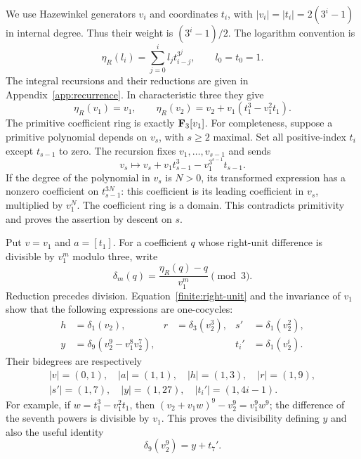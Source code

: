 We use Hazewinkel generators $v_i$ and coordinates $t_i$, with
$|v_i|=|t_i|=2(3^i-1)$ in internal degree.  Thus their weight is
$(3^i-1)/2$.  The logarithm convention is
\[
 \eta_R(l_i)=\sum_{j=0}^i l_jt_{i-j}^{3^j},\qquad l_0=t_0=1.
\]
The integral recursions and their reductions are given in
Appendix~\ref{app:recurrence}.  In characteristic three they give
\begin{equation}\label{finite:right-unit}
 \eta_R(v_1)=v_1,\qquad
 \eta_R(v_2)=v_2+v_1(t_1^3-v_1^2t_1).
\end{equation}
The primitive coefficient ring is exactly $\mathbf F_3[v_1]$.  For
completeness, suppose a primitive polynomial depends on $v_s$, with
$s\geq2$ maximal.  Set all positive-index $t_i$ except $t_{s-1}$ to
zero.  The recursion fixes $v_1,\ldots,v_{s-1}$ and sends
\[
 v_s\longmapsto v_s+v_1t_{s-1}^3-v_1^{3^{s-1}}t_{s-1}.
\]
If the degree of the polynomial in $v_s$ is $N>0$, its transformed
expression has a nonzero coefficient on $t_{s-1}^{3N}$: this
coefficient is its leading coefficient in $v_s$, multiplied by
$v_1^N$.  The coefficient ring is a domain.  This contradicts
primitivity and proves the assertion by descent on $s$.

Put $v=v_1$ and $a=[t_1]$.  For a coefficient $q$ whose right-unit
difference is divisible by $v_1^m$ modulo three, write
\[
 \delta_m(q)=\frac{\eta_R(q)-q}{v_1^m}\pmod3.
\]
Reduction precedes division.  Equation~\eqref{finite:right-unit} and
the invariance of $v_1$ show that the following expressions are
one-cocycles:
\begin{align*}
 h&=\delta_1(v_2),& r&=\delta_3(v_2^3),&
 s'&=\delta_1(v_2^2),\\
y&=\delta_9(v_2^9-v_1^8v_2^7),&&&
 t_i'&=\delta_1(v_2^i).
\end{align*}
Their bidegrees are respectively
\begin{gather*}
 |v|=(0,1),\quad |a|=(1,1),\quad |h|=(1,3),\quad |r|=(1,9),\\
 |s'|=(1,7),\quad |y|=(1,27),\quad |t_i'|=(1,4i-1).
\end{gather*}
For example, if $w=t_1^3-v_1^2t_1$, then
$(v_2+v_1w)^9-v_2^9=v_1^9w^9$; the difference of the seventh powers
is divisible by $v_1$.  This proves the divisibility defining $y$ and
also the useful identity
\begin{equation}\label{finite:corrected-y}
 \delta_9(v_2^9)=y+t_7'.
\end{equation}

